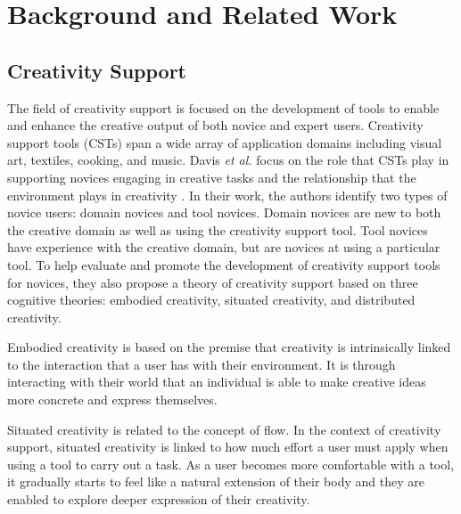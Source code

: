 


\section{Background and Related Work}
\subsection{Creativity Support}
The field of creativity support is focused on the development of tools to enable and enhance the creative output of both novice and expert users. Creativity support tools (CSTs) span a wide array of application domains including visual art, textiles, cooking, and music. Davis \textit{et al.} focus on the role that CSTs play in supporting novices engaging in creative tasks and the relationship that the environment plays in creativity \cite{davis2013toward}. 
In their work, the authors identify two types of novice users: domain novices and tool novices. Domain novices are new to both the creative domain as well as using the creativity support tool. Tool novices have experience with the creative domain, but are novices at using a particular tool. To help evaluate and promote the development of creativity support tools for novices, they also propose a theory of creativity support based on three cognitive theories: embodied creativity, situated creativity, and distributed creativity.

Embodied creativity is based on the premise that creativity is intrinsically linked to the interaction that a user has with their environment. It is through interacting with their world that an individual is able to make creative ideas more concrete and express themselves.

Situated creativity is related to the concept of flow. In the context of creativity support, situated creativity is linked to how much effort a user must apply when using a tool to carry out a task. As a user becomes more comfortable with a tool, it gradually starts to feel like a natural extension of their body and they are enabled to explore deeper expression of their creativity.


